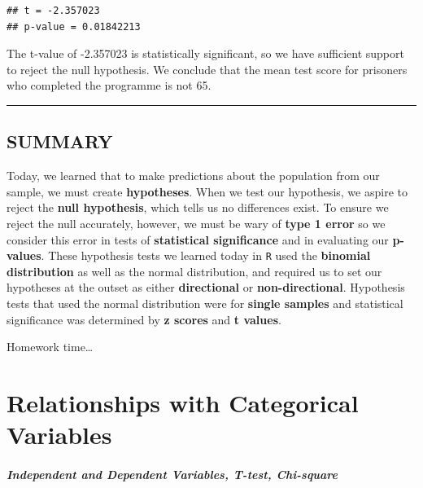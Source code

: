 \documentclass[
]{book}
\begin{document}
\begin{verbatim}
## t = -2.357023 
## p-value = 0.01842213
\end{verbatim}

The t-value of -2.357023 is statistically significant, so we have sufficient support to reject the null hypothesis. We conclude that the mean test score for prisoners who completed the programme is not 65.

\begin{center}\rule{0.5\linewidth}{0.5pt}\end{center}

\hypertarget{summary-5}{%
\section{SUMMARY}\label{summary-5}}

Today, we learned that to make predictions about the population from our sample, we must create \textbf{hypotheses}. When we test our hypothesis, we aspire to reject the \textbf{null hypothesis}, which tells us no differences exist. To ensure we reject the null accurately, however, we must be wary of \textbf{type 1 error} so we consider this error in tests of \textbf{statistical significance} and in evaluating our \textbf{p-values}. These hypothesis tests we learned today in \texttt{R} used the \textbf{binomial distribution} as well as the normal distribution, and required us to set our hypotheses at the outset as either \textbf{directional} or \textbf{non-directional}. Hypothesis tests that used the normal distribution were for \textbf{single samples} and statistical significance was determined by \textbf{z scores} and \textbf{t values}.

Homework time\ldots{}

\hypertarget{relationships-with-categorical-variables}{%
\chapter{Relationships with Categorical Variables}\label{relationships-with-categorical-variables}}

\hypertarget{independent-and-dependent-variables-t-test-chi-square}{%
\subsubsection*{\texorpdfstring{\emph{Independent and Dependent Variables, T-test, Chi-square}}{Independent and Dependent Variables, T-test, Chi-square}}\label{independent-and-dependent-variables-t-test-chi-square}}
\end{document}
